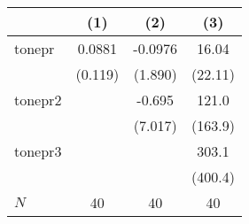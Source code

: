 {
\def\sym#1{\ifmmode^{#1}\else\(^{#1}\)\fi}
\begin{tabular}{l*{3}{c}}
\hline\hline
            &\multicolumn{1}{c}{(1)}         &\multicolumn{1}{c}{(2)}         &\multicolumn{1}{c}{(3)}         \\
\hline
tonepr      &      0.0881         &     -0.0976         &       16.04         \\
            &     (0.119)         &     (1.890)         &     (22.11)         \\
[1em]
tonepr2     &                     &      -0.695         &       121.0         \\
            &                     &     (7.017)         &     (163.9)         \\
[1em]
tonepr3     &                     &                     &       303.1         \\
            &                     &                     &     (400.4)         \\
\hline
\(N\)       &          40         &          40         &          40         \\
\hline\hline
\end{tabular}
}
